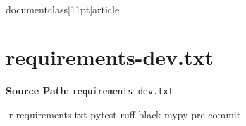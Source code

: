 \\documentclass[11pt]{article}
\begin{document}
\section*{requirements-dev.txt}
\textbf{Source Path}: \texttt{requirements-dev.txt}\par
\bigskip
\begin{CodeBlock}
-r requirements.txt
pytest
ruff
black
mypy
pre-commit

\end{CodeBlock}
\end{document}
